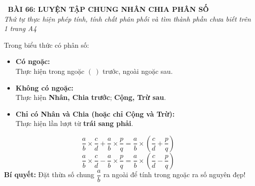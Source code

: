 \documentclass[14pt,a4paper,oneside]{extbook}
\begin{document}
\noindent
\begin{tcolorbox}[
  enhanced,
  colback=teal!8!white,
  colframe=teal!80!black,
  arc=3mm, boxrule=1pt,
  left=3mm, right=3mm, top=2mm, bottom=2mm,
  halign=center
]
  {\Large\bfseries\color{teal!90!black}\faBookmark\ BÀI 66: LUYỆN TẬP CHUNG NHÂN CHIA PHÂN SỐ}\\[1.5pt]
  {\footnotesize\itshape\color{black!75} Thứ tự thực hiện phép tính, tính chất phân phối và tìm thành phần chưa biết trên 1 trang A4}
\end{tcolorbox}

\vspace{-2.5mm}

\noindent
\begin{minipage}[t]{0.49\textwidth}\vspace{0pt}
\begin{tcolorbox}[
  enhanced,
  colback=blue!4!white,
  colframe=blue!75!black,
  arc=2mm, boxrule=0.8pt,
  left=2mm, right=2mm, top=1.8mm, bottom=1.8mm,
  title={\footnotesize\bfseries\color{white}\faListOl\ 1. Thứ tự thực hiện phép tính}
]
{\footnotesize
Trong biểu thức có phân số:
\begin{itemize}\setlength{\itemsep}{1pt}\setlength{\leftskip}{-2.5mm}
  \item \textbf{Có ngoặc:}\\
  Thực hiện trong ngoặc $(~)$ trước, ngoài ngoặc sau.
  \item \textbf{Không có ngoặc:}\\
  Thực hiện \textbf{Nhân, Chia trước}; \textbf{Cộng, Trừ sau}.
  \item \textbf{Chỉ có Nhân và Chia (hoặc chỉ Cộng và Trừ):}\\
  Thực hiện lần lượt từ \textbf{trái sang phải}.
\end{itemize}
}
\end{tcolorbox}
\end{minipage}
\hfill
\begin{minipage}[t]{0.49\textwidth}\vspace{0pt}
\begin{tcolorbox}[
  enhanced,
  colback=teal!4!white,
  colframe=teal!75!black,
  arc=2mm, boxrule=0.8pt,
  left=2mm, right=2mm, top=1.8mm, bottom=1.8mm,
  title={\footnotesize\bfseries\color{white}\faMagic\ 2. Tính chất phân phối nhân với cộng}
]
{\footnotesize
$$\dfrac{a}{b} \times \dfrac{c}{d} + \dfrac{a}{b} \times \dfrac{p}{q} = \dfrac{a}{b} \times \left(\dfrac{c}{d} + \dfrac{p}{q}\right)$$
$$\dfrac{a}{b} \times \dfrac{c}{d} - \dfrac{a}{b} \times \dfrac{p}{q} = \dfrac{a}{b} \times \left(\dfrac{c}{d} - \dfrac{p}{q}\right)$$
\textbf{Bí quyết:} Đặt thừa số chung $\dfrac{a}{b}$ ra ngoài để tính trong ngoặc ra số nguyên đẹp!
}
\end{tcolorbox}
\end{minipage}
\end{document}
